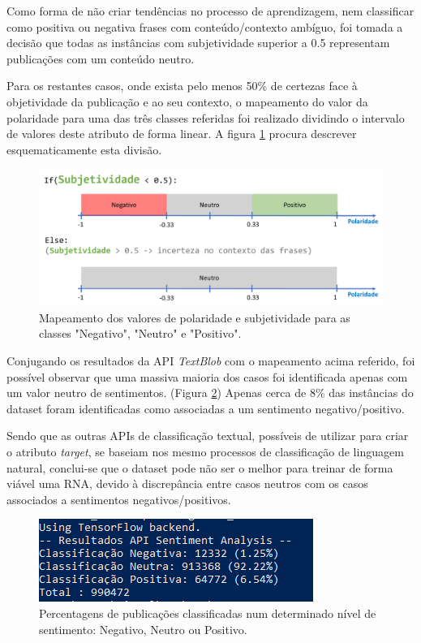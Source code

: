 Como forma de não criar tendências no processo de aprendizagem, nem classificar como positiva ou negativa frases com conteúdo/contexto ambíguo, foi tomada a decisão que todas as instâncias com subjetividade superior a 0.5 representam publicações com um conteúdo neutro. 

Para os restantes casos, onde exista pelo menos 50\% de certezas face à objetividade da publicação e ao seu contexto, o mapeamento do valor da polaridade para uma das três classes referidas foi realizado dividindo o intervalo de valores deste atributo de forma linear. 
A figura \ref{fig:niveisSentimento} procura descrever esquematicamente esta divisão. 

\begin{figure}[t]
    \centering
    \includegraphics[scale=0.5]{Imagens/niveisSentimento.png}
    \caption{Mapeamento dos valores de polaridade e subjetividade para as classes "Negativo", "Neutro" e "Positivo". }
    \label{fig:niveisSentimento}
\end{figure}

Conjugando os resultados da API \textit{TextBlob} com o mapeamento acima referido, foi possível observar que uma massiva maioria dos casos foi identificada apenas com um valor neutro de sentimentos. (Figura \ref{fig:medidas})
Apenas cerca de 8\% das instâncias do dataset foram identificadas como associadas a um sentimento negativo/positivo. 

Sendo que as outras APIs de classificação textual, possíveis de utilizar para criar o atributo \textit{target}, se baseiam nos mesmo processos de classificação de linguagem natural, conclui-se que o dataset pode não ser o melhor para treinar de forma viável uma RNA, devido à discrepância entre casos neutros com os casos associados a sentimentos negativos/positivos. 

\begin{figure}
    \centering
    \includegraphics{Imagens/medidas.png}
    \caption{Percentagens de publicações classificadas num determinado nível de sentimento: Negativo, Neutro ou Positivo. }
    \label{fig:medidas}
\end{figure}

